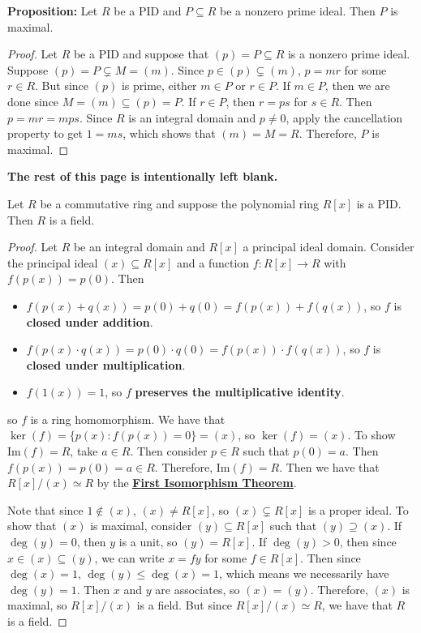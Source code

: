 \documentclass [12pt]{article}
\newcounter{corcounter}[section]
\renewcommand{\thecorcounter}{\thesection.\arabic{corcounter}}
\newenvironment{corollary}[1]{
  \refstepcounter{corcounter}
  \begin{tcolorbox}[title={Corollary \thecorcounter: #1}]
}{ \end{tcolorbox} }
\renewcommand{\href}[2]{\hyperref[#1]{\bf{\underline{{#2}}}}}
\renewcommand{\bf}[1]{\textbf{{#1}}}
\renewcommand{\Im}{\text{Im}}
\begin{document}
\bf{Proposition:} Let $R$ be a PID and $P \subseteq R$ be a nonzero prime ideal. Then $P$ is
maximal.
\begin{proof}
    Let $R$ be a PID and suppose that $(p) = P \subseteq R$ is a nonzero prime ideal. Suppose
    $(p) = P \subsetneq M = (m)$. Since $p \in (p) \subsetneq (m)$, $p = mr$ for some $r \in R$.
    But since $(p)$ is prime, either $m \in P$ or $r \in P$. If $m \in P$, then we are done since
    $M = (m) \subseteq (p) = P$. If $r \in P$, then $r = ps$ for $s \in R$. Then
    $p = mr = mps$. Since $R$ is an integral domain and $p \neq 0$, apply the cancellation property
    to get $1 = ms$, which shows that $(m) = M = R$. Therefore, $P$ is maximal.
\end{proof}
\begin{center}
    \vspace{5em}
    \bf{The rest of this page is intentionally left blank.}
\end{center}

\newpage
\begin{corollary}{}
    Let $R$ be a commutative ring and suppose the polynomial ring $R[x]$ is a PID. Then $R$ is a
    field.
\end{corollary}
\begin{proof}
    Let $R$ be an integral domain and $R[x]$ a principal ideal domain. Consider the principal ideal
    $(x) \subseteq R[x]$ and a function $f : R[x] \to R$ with $f(p(x)) = p(0)$. Then
    \begin{itemize}
        \item $f(p(x) + q(x)) = p(0) + q(0) = f(p(x)) + f(q(x))$, so $f$ is
            \bf{closed under addition}.
        \item $f(p(x) \cdot q(x)) = p(0) \cdot q(0) = f(p(x)) \cdot f(q(x))$, so $f$ is
            \bf{closed under multiplication}.
        \item $f(1(x)) = 1$, so $f$ \bf{preserves the multiplicative identity}.
    \end{itemize}
    so $f$ is a ring homomorphism. We have that $\ker(f) = \{ p(x) : f(p(x)) = 0 \} = (x)$, so
    $\ker(f) = (x)$. To show $\Im(f) = R$, take $a \in R$. Then consider
    $p \in R$ such that $p(0) = a$. Then $f(p(x)) = p(0) = a \in R$. Therefore,
    $\Im(f) = R$. Then we have that $R[x]/(x) \simeq R$ by the
    \href{thm:isothm}{First Isomorphism Theorem}.
    \vspace{0.5em}

    Note that since $1 \not \in (x)$, $(x) \neq R[x]$, so $(x) \subsetneq R[x]$ is a proper ideal.
    To show that $(x)$ is maximal, consider $(y) \subseteq R[x]$ such that $(y) \supseteq (x)$.
    If $\deg(y) = 0$, then $y$ is a unit, so $(y) = R[x]$. If $\deg(y) > 0$, then since
    $x \in (x) \subseteq (y)$, we can write $x = fy$ for some $f \in R[x]$. Then since
    $\deg(x) = 1$, $\deg(y) \leq \deg(x) = 1$, which means we necessarily have $\deg(y) = 1$. Then
    $x$ and $y$ are associates, so $(x) = (y)$. Therefore, $(x)$ is maximal, so $R[x]/(x)$ is a
    field. But since $R[x]/(x) \simeq R$, we have that $R$ is a field.
\end{proof}
\end{document}
